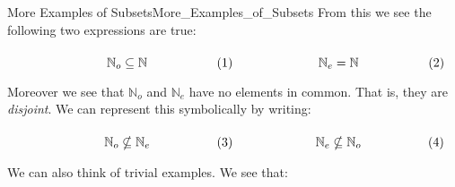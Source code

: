 \begin{fexample}{More Examples of Subsets}{More_Examples_of_Subsets}
            From this we see the following two expressions are true:
            \par\hfill\par
            \begin{subequations}
                \begin{minipage}[b]{0.49\textwidth}
                    \begin{equation}
                        \mathbb{N}_{o}\subseteq\mathbb{N}
                    \end{equation}
                \end{minipage}
                \hfill
                \begin{minipage}[b]{0.49\textwidth}
                    \begin{equation}
                        \mathbb{N}_{e}=\mathbb{N}
                    \end{equation}
                \end{minipage}
            \end{subequations}
            \par\vspace{2.5ex}
            Moreover we see that $\mathbb{N}_{o}$ and $\mathbb{N}_{e}$ have no
            elements in common. That is, they are \textit{disjoint}. We can
            represent this symbolically by writing:
            \par\hfill\par
            \begin{subequations}
                \begin{minipage}[b]{0.49\textwidth}
                    \begin{equation}
                        \mathbb{N}_{o}\nsubseteq\mathbb{N}_{e}
                    \end{equation}
                \end{minipage}
                \hfill
                \begin{minipage}[b]{0.49\textwidth}
                    \begin{equation}
                        \mathbb{N}_{e}\nsubseteq\mathbb{N}_{o}
                    \end{equation}
                \end{minipage}
            \end{subequations}
            \par\vspace{2.5ex}
            We can also think of trivial examples. We see that:

\end{fexample}
